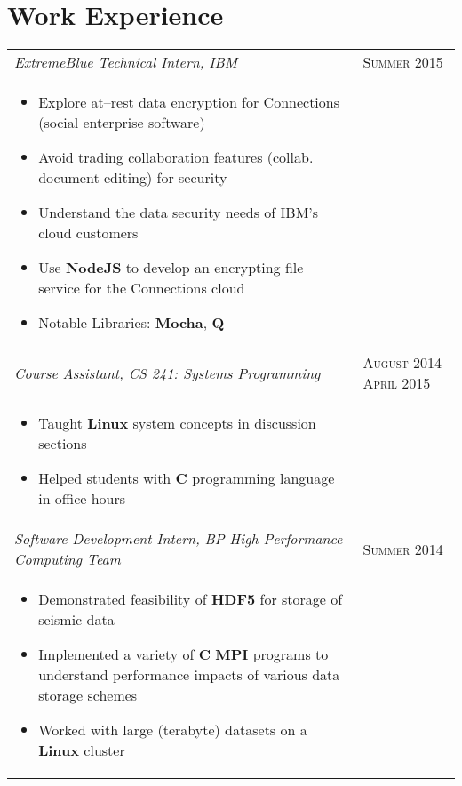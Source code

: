 \documentclass[letterpaper,10pt]{article}
\begin{document}
\section{Work Experience}
\begin{tabular}{p{12.8cm}>{\raggedleft\arraybackslash}p{3cm}}

    \emph{ExtremeBlue Technical Intern, IBM} & \textsc{Summer 2015} \\

    \vspace{-2mm}
    \begin{itemize}
        \item
            Explore at--rest data encryption for Connections (social
            enterprise software)
        \item
            Avoid trading collaboration features (collab. document editing) for
            security
        \item
            Understand the data security needs of IBM's cloud customers
        \item
            Use \textbf{NodeJS} to develop an encrypting file service for the
            Connections cloud
        \item
            Notable Libraries: \textbf{Mocha}, \textbf{Q}
    \end{itemize} \\

    \emph{Course Assistant, CS 241: Systems Programming} &
    \textsc{August 2014 April 2015} \\

    \vspace{-6mm}
    \begin{itemize}
        \item
            Taught \textbf{Linux} system concepts in discussion sections
        \item
            Helped students with \textbf{C} programming language in office hours
    \end{itemize} \\

    \emph{Software Development Intern, BP High Performance Computing Team} &
    \textsc{Summer 2014} \\

    \vspace{-2mm}
    \begin{itemize}
        \item
            Demonstrated feasibility of \textbf{HDF5} for storage of seismic
            data
        \item
            Implemented a variety of \textbf{C} \textbf{MPI} programs to
            understand performance impacts of various data storage schemes
        \item
            Worked with large (terabyte) datasets on a \textbf{Linux} cluster


\end{itemize}
\end{tabular}
\end{document}
